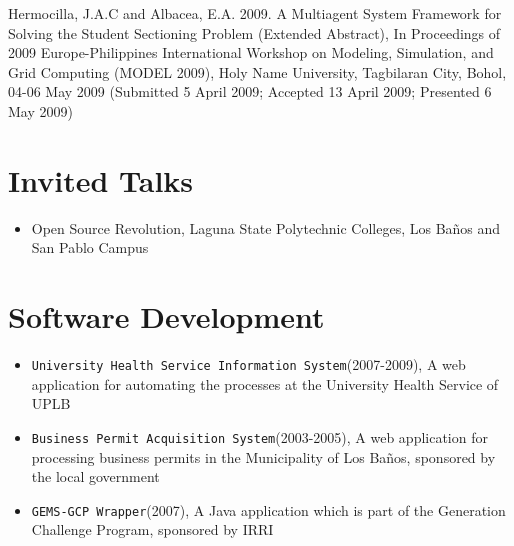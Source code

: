 \documentclass[overlapped,line,letterpaper]{res}
\begin{document}
\begin{resume}
Hermocilla, J.A.C and Albacea, E.A. 2009. A Multiagent System Framework for Solving the Student Sectioning Problem (Extended Abstract), In Proceedings of 2009 Europe-Philippines International Workshop on Modeling, Simulation, and Grid Computing (MODEL 2009), Holy Name University, Tagbilaran City, Bohol, 04-06 May 2009 (Submitted 5 April 2009; Accepted 13 April 2009; Presented 6 May 2009)


\section{\bf Invited Talks}
\begin{itemize}
\item Open Source Revolution, Laguna State Polytechnic Colleges, Los Ba\~{n}os and
San Pablo Campus
\end{itemize}

\section{\bf Software Development}
\begin{itemize}
\item {\texttt{University Health Service Information System}}(2007-2009), A web application for automating the processes at the University Health Service of UPLB
\item {\texttt{Business Permit Acquisition System}}(2003-2005), A web application for processing business permits in the
Municipality of Los Ba\~{n}os, sponsored by the local government
\item {\texttt{GEMS-GCP Wrapper}}(2007), A Java application which is part of the Generation Challenge Program,
sponsored by IRRI
\end{itemize}






\end{resume}
\end{document}
